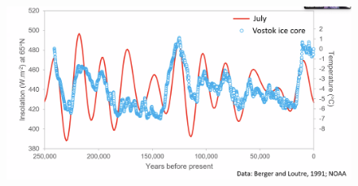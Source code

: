 \begin{figure}[H]
    \centering
    \includegraphics[width=0.75\linewidth]{content//img/vostok_ice_core.png}
\end{figure}
